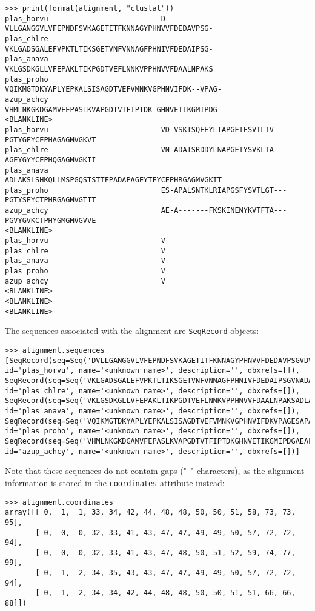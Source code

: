 \begin{verbatim}
>>> print(format(alignment, "clustal"))
plas_horvu                          D-VLLGANGGVLVFEPNDFSVKAGETITFKNNAGYPHNVVFDEDAVPSG-
plas_chlre                          --VKLGADSGALEFVPKTLTIKSGETVNFVNNAGFPHNIVFDEDAIPSG-
plas_anava                          --VKLGSDKGLLVFEPAKLTIKPGDTVEFLNNKVPPHNVVFDAALNPAKS
plas_proho                          VQIKMGTDKYAPLYEPKALSISAGDTVEFVMNKVGPHNVIFDK--VPAG-
azup_achcy                          VHMLNKGKDGAMVFEPASLKVAPGDTVTFIPTDK-GHNVETIKGMIPDG-
<BLANKLINE>
plas_horvu                          VD-VSKISQEEYLTAPGETFSVTLTV---PGTYGFYCEPHAGAGMVGKVT
plas_chlre                          VN-ADAISRDDYLNAPGETYSVKLTA---AGEYGYYCEPHQGAGMVGKII
plas_anava                          ADLAKSLSHKQLLMSPGQSTSTTFPADAPAGEYTFYCEPHRGAGMVGKIT
plas_proho                          ES-APALSNTKLRIAPGSFYSVTLGT---PGTYSFYCTPHRGAGMVGTIT
azup_achcy                          AE-A-------FKSKINENYKVTFTA---PGVYGVKCTPHYGMGMVGVVE
<BLANKLINE>
plas_horvu                          V
plas_chlre                          V
plas_anava                          V
plas_proho                          V
azup_achcy                          V
<BLANKLINE>
<BLANKLINE>
<BLANKLINE>
\end{verbatim}
The sequences associated with the alignment are \verb|SeqRecord| objects:
\begin{verbatim}
>>> alignment.sequences
[SeqRecord(seq=Seq('DVLLGANGGVLVFEPNDFSVKAGETITFKNNAGYPHNVVFDEDAVPSGVDVSKI...VTV'), id='plas_horvu', name='<unknown name>', description='', dbxrefs=[]), SeqRecord(seq=Seq('VKLGADSGALEFVPKTLTIKSGETVNFVNNAGFPHNIVFDEDAIPSGVNADAIS...IIV'), id='plas_chlre', name='<unknown name>', description='', dbxrefs=[]), SeqRecord(seq=Seq('VKLGSDKGLLVFEPAKLTIKPGDTVEFLNNKVPPHNVVFDAALNPAKSADLAKS...ITV'), id='plas_anava', name='<unknown name>', description='', dbxrefs=[]), SeqRecord(seq=Seq('VQIKMGTDKYAPLYEPKALSISAGDTVEFVMNKVGPHNVIFDKVPAGESAPALS...ITV'), id='plas_proho', name='<unknown name>', description='', dbxrefs=[]), SeqRecord(seq=Seq('VHMLNKGKDGAMVFEPASLKVAPGDTVTFIPTDKGHNVETIKGMIPDGAEAFKS...VEV'), id='azup_achcy', name='<unknown name>', description='', dbxrefs=[])]
\end{verbatim}
Note that these sequences do not contain gaps ("\verb|-|" characters), as the alignment information is stored in the \verb|coordinates| attribute instead:
\begin{verbatim}
>>> alignment.coordinates
array([[ 0,  1,  1, 33, 34, 42, 44, 48, 48, 50, 50, 51, 58, 73, 73, 95],
       [ 0,  0,  0, 32, 33, 41, 43, 47, 47, 49, 49, 50, 57, 72, 72, 94],
       [ 0,  0,  0, 32, 33, 41, 43, 47, 48, 50, 51, 52, 59, 74, 77, 99],
       [ 0,  1,  2, 34, 35, 43, 43, 47, 47, 49, 49, 50, 57, 72, 72, 94],
       [ 0,  1,  2, 34, 34, 42, 44, 48, 48, 50, 50, 51, 51, 66, 66, 88]])
\end{verbatim}
